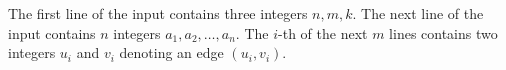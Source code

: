 The first line of the input contains three integers $n,m,k$.
The next line of the input contains $n$ integers $a_1,a_2,\ldots,a_n$.
The $i$-th of the next $m$ lines contains two integers $u_i$ and $v_i$ denoting an edge $(u_i,v_i)$.